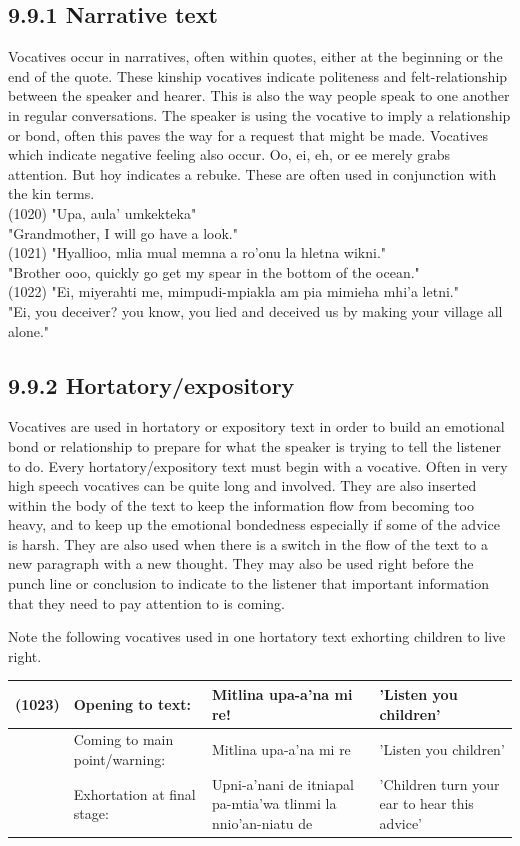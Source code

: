 \documentclass[10pt]{article}
\begin{document}
\subsection*{9.9.1 Narrative text}
Vocatives occur in narratives, often within quotes, either at the beginning or the end of the quote. These kinship vocatives indicate politeness and felt-relationship between the speaker and hearer. This is also the way people speak to one another in regular conversations. The speaker is using the vocative to imply a relationship or bond, often this paves the way for a request that might be made. Vocatives which indicate negative feeling also occur. Oo, ei, eh, or ee merely grabs attention. But hoy indicates a rebuke. These are often used in conjunction with the kin terms.\\
(1020) "Upa, aula' umkekteka"\\
"Grandmother, I will go have a look."\\
(1021) "Hyallioo, mlia mual memna a ro'onu la hletna wikni."\\
"Brother ooo, quickly go get my spear in the bottom of the ocean."\\
(1022) "Ei, miyerahti me, mimpudi-mpiakla am pia mimieha mhi'a letni."\\
"Ei, you deceiver? you know, you lied and deceived us by making your village all alone."

\subsection*{9.9.2 Hortatory/expository}
Vocatives are used in hortatory or expository text in order to build an emotional bond or relationship to prepare for what the speaker is trying to tell the listener to do. Every hortatory/expository text must begin with a vocative. Often in very high speech vocatives can be quite long and involved. They are also inserted within the body of the text to keep the information flow from becoming too heavy, and to keep up the emotional bondedness especially if some of the advice is harsh. They are also used when there is a switch in the flow of the text to a new paragraph with a new thought. They may also be used right before the punch line or conclusion to indicate to the listener that important information that they need to pay attention to is coming.

Note the following vocatives used in one hortatory text exhorting children to live right.

\begin{center}
\begin{tabular}{|l|l|l|l|}
\hline
(1023) & Opening to text: & Mitlina upa-a'na mi re! & 'Listen you children' \\
\hline
 & Coming to main point/warning: & Mitlina upa-a'na mi re & 'Listen you children' \\
\hline
 & Exhortation at final stage: & Upni-a'nani de itniapal pa-mtia'wa tlinmi la nnio'an-niatu de & 'Children turn your ear to hear this advice' \\
\hline
\end{tabular}
\end{center}
\end{document}
